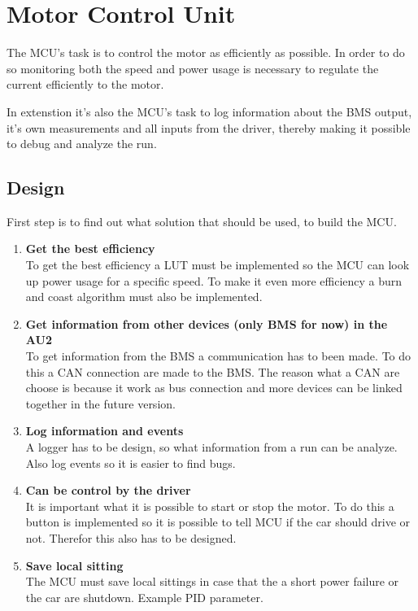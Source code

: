 \section{Motor Control Unit}

The MCU's task is to control the motor as efficiently as possible. In order to do so monitoring both the speed and power usage is necessary to regulate the current efficiently to the motor.

In extenstion it's also the MCU's task to log information about the BMS output, it's own measurements and all inputs from the driver, thereby making it possible to debug and analyze the run. 

\subsection{Design}

First step is to find out what solution that should be used, to build the MCU. 

\begin{enumerate} %
	\item \textbf{Get the best efficiency}\\
	To get the best efficiency a LUT must be implemented so the MCU can look up power usage for a specific speed. To make it even more efficiency a burn and coast algorithm must also be implemented. \\
	\item \textbf{Get information from other devices (only BMS for now) in the AU2}\\
	To get information from the BMS a communication has to been made. To do this a CAN connection are made to the BMS. The reason what a CAN are choose is because it work as bus connection and more devices can be linked together in the future version.\\
	\item \textbf{Log information and events}\\
	A logger has to be design, so what information from a run can be analyze. Also log events so it is easier to find bugs.\\
	\item \textbf{Can be control by the driver}\\
	It is important what it is possible to start or stop the motor. To do this a button is implemented so it is possible to tell MCU if the car should drive or not. Therefor this also has to be designed.\\
	\item \textbf{Save local sitting}\\
	The MCU must save local sittings in case that the a short power failure or the car are shutdown. Example PID parameter.\\
\end{enumerate}

